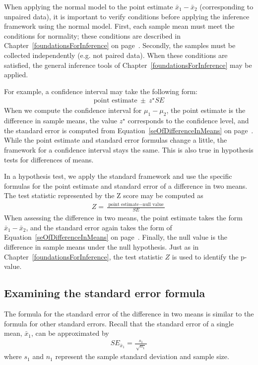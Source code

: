 When applying the normal model to the point estimate $\bar{x}_1 - \bar{x}_2$ (corresponding to unpaired data), it is important to verify conditions before applying the inference framework using the normal model. First, each sample mean must meet the conditions for normality; these conditions are described in Chapter~\ref{foundationsForInference} on page~\pageref{terBoxOfCondForXBarBeingNearlyNormalAndSEBeingAccurate}. Secondly, the samples must be collected independently (e.g. not paired data). When these conditions are satisfied, the general inference tools of Chapter~\ref{foundationsForInference} may be applied.

For example, a confidence interval may take the following form:
\begin{eqnarray*}
\text{point estimate}\ \pm\ z^{\star} SE
\end{eqnarray*}
When we compute the confidence interval for $\mu_1 - \mu_2$, the point estimate is the difference in sample means, the value $z^{\star}$ corresponds to the confidence level, and the standard error is computed from Equation~\eqref{seOfDifferenceInMeans} on page~\pageref{seOfDifferenceInMeans}. While the point estimate and standard error formulas change a little, the framework for a confidence interval stays the same. This is also true in hypothesis tests for differences of means.

In a hypothesis test, we apply the standard framework and use the specific formulas for the point estimate and standard error of a difference in two means. The test statistic represented by the Z score may be computed as
\begin{eqnarray*}
Z = \frac{\ \text{point estimate} - \text{null value}\ }{SE}
\end{eqnarray*}
When assessing the difference in two means, the point estimate takes the form $\bar{x}_1 - \bar{x}_2$, and the standard error again takes the form of Equation~\eqref{seOfDifferenceInMeans} on page~\pageref{seOfDifferenceInMeans}. Finally, the null value is the difference in sample means under the null hypothesis. Just as in Chapter~\ref{foundationsForInference}, the test statistic $Z$ is used to identify the p-value.

\subsection{Examining the standard error formula}

The formula for the standard error of the difference in two means is similar to the formula for other standard errors. Recall that the standard error of a single mean, $\bar{x}_1$, can be approximated by
\begin{eqnarray*}
SE_{\bar{x}_1} = \frac{s_1}{\ \sqrt{n_1}\ }
\end{eqnarray*}
where $s_1$ and $n_1$ represent the sample standard deviation and sample size.

